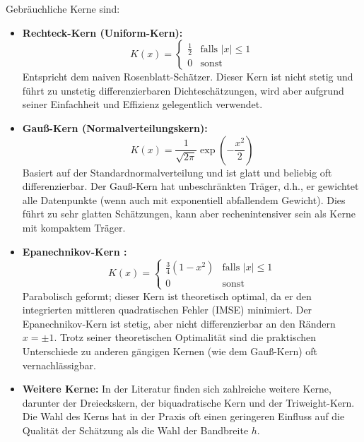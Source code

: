 \documentclass[a4paper, 11pt]{scrartcl}
\begin{document}
Gebräuchliche Kerne sind:
\begin{itemize}
	\item \textbf{Rechteck-Kern (Uniform-Kern):} 
	      \begin{equation}
	      	K(x) = \begin{cases}
	      		\frac{1}{2} & \text{falls } |x| \le 1 \\
	      		0 & \text{sonst}
	      	\end{cases}
	      \end{equation}
	      Entspricht dem naiven Rosenblatt-Schätzer. Dieser Kern ist nicht stetig und führt zu unstetig differenzierbaren Dichteschätzungen, wird aber aufgrund seiner Einfachheit und Effizienz gelegentlich verwendet.
	      
	\item \textbf{Gauß-Kern (Normalverteilungskern):} 
	      \begin{equation}
	      	K(x) = \frac{1}{\sqrt{2\pi}} \exp\left(-\frac{x^2}{2}\right)
	      \end{equation}
	      Basiert auf der Standardnormalverteilung und ist glatt und beliebig oft differenzierbar. Der Gauß-Kern hat unbeschränkten Träger, d.h., er gewichtet alle Datenpunkte (wenn auch mit exponentiell abfallendem Gewicht). Dies führt zu sehr glatten Schätzungen, kann aber rechenintensiver sein als Kerne mit kompaktem Träger.
	      
	\item \textbf{Epanechnikov-Kern \cite{Epanechnikov1969}:} 
	      \begin{equation}
	      	K(x) = \begin{cases}
	      		\frac{3}{4}(1-x^2) & \text{falls } |x| \le 1 \\
	      		0 & \text{sonst}
	      	\end{cases}
	      \end{equation}
	      Parabolisch geformt; dieser Kern ist theoretisch optimal, da er den integrierten mittleren quadratischen Fehler (IMSE) minimiert. Der Epanechnikov-Kern ist stetig, aber nicht differenzierbar an den Rändern $x = \pm 1$. Trotz seiner theoretischen Optimalität sind die praktischen Unterschiede zu anderen gängigen Kernen (wie dem Gauß-Kern) oft vernachlässigbar.
	      
	\item \textbf{Weitere Kerne:} In der Literatur finden sich zahlreiche weitere Kerne, darunter der Dreieckskern, der biquadratische Kern und der Triweight-Kern. Die Wahl des Kerns hat in der Praxis oft einen geringeren Einfluss auf die Qualität der Schätzung als die Wahl der Bandbreite $h$.
\end{itemize}
\end{document}
